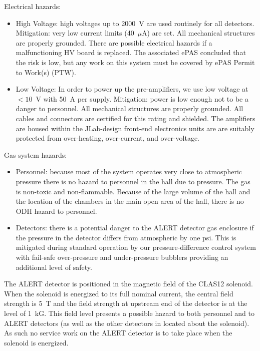 Electrical hazards:
\begin{itemize}
\item High Voltage: high voltages up to 2000~V are used routinely for all detectors. Mitigation: 
very low current limits (40~$\mu$A) are set. All mechanical structures are properly grounded.  
There are possible electrical hazards if a malfunctioning HV board is replaced. The associated
ePAS concluded that the risk is low, but any work on this system must be covered by ePAS Permit
to Work(s) (PTW).

\item Low Voltage: In order to power up the pre-amplifiers, we use low voltage at $<10$~V with
50~A per supply. Mitigation: power is low enough not to be a danger to personnel. All mechanical
structures are properly grounded. All cables and connectors are certified for this rating and
shielded. The amplifiers are housed within the JLab-design front-end electronics units are are
suitably protected from over-heating, over-current, and over-voltage.

\end{itemize}

Gas system hazards:
\begin{itemize}
\item Personnel: because most of the system operates very close to atmospheric pressure there 
is no hazard to personnel in the hall due to pressure. The gas is non-toxic and non-flammable.  
Because of the large volume of the hall and the location of the chambers in the main open area 
of the hall, there is no ODH hazard to personnel.
\item Detectors: there is a potential danger to the ALERT detector gas enclosure if the pressure
in the detector differs from atmospheric by one psi. This is mitigated during standard operation by our 
pressure-difference control system with fail-safe over-pressure and under-pressure bubblers 
providing an additional level of safety.
\end{itemize}

The ALERT detector is positioned in the magnetic field of the CLAS12 solenoid. When the solenoid is
energized to its full nominal current, the central field strength is 5~T and the field strength at
upstream end of the detector is at the level of 1~kG. This field level presents a possible hazard to
both personnel and to ALERT detectors (as well as the other detectors in located about the solenoid).
As such no service work on the ALERT detector is to take place when the solenoid is energized.

